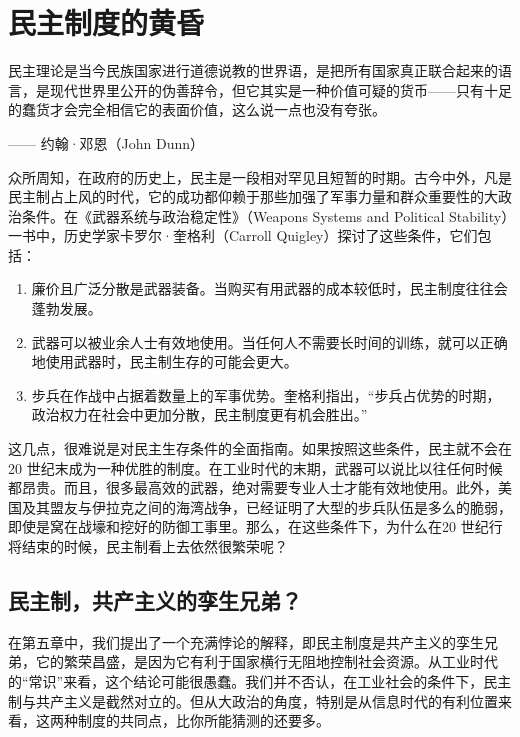 \chapter{民主制度的黄昏}

\begin{tcolorbox}
民主理论是当今民族国家进行道德说教的世界语，是把所有国家真正联合起来的语言，是现代世界里公开的伪善辞令，但它其实是一种价值可疑的货币——只有十足的蠢货才会完全相信它的表面价值，这么说一点也没有夸张。
\begin{flushright}
—— 约翰·邓恩（John Dunn）
\end{flushright}
\end{tcolorbox}


众所周知，在政府的历史上，民主是一段相对罕见且短暂的时期。古今中外，凡是民主制占上风的时代，它的成功都仰赖于那些加强了军事力量和群众重要性的大政治条件。在《武器系统与政治稳定性》（Weapons Systems and Political Stability）一书中，历史学家卡罗尔·奎格利（Carroll Quigley）探讨了这些条件，它们包括：

\begin{enumerate}
    \item 廉价且广泛分散是武器装备。当购买有用武器的成本较低时，民主制度往往会蓬勃发展。
    \item 武器可以被业余人士有效地使用。当任何人不需要长时间的训练，就可以正确地使用武器时，民主制生存的可能会更大。
    \item 步兵在作战中占据着数量上的军事优势。奎格利指出，“步兵占优势的时期，政治权力在社会中更加分散，民主制度更有机会胜出。” 
\end{enumerate}

这几点，很难说是对民主生存条件的全面指南。如果按照这些条件，民主就不会在 20 世纪末成为一种优胜的制度。在工业时代的末期，武器可以说比以往任何时候都昂贵。而且，很多最高效的武器，绝对需要专业人士才能有效地使用。此外，美国及其盟友与伊拉克之间的海湾战争，已经证明了大型的步兵队伍是多么的脆弱，即使是窝在战壕和挖好的防御工事里。那么，在这些条件下，为什么在20 世纪行将结束的时候，民主制看上去依然很繁荣呢？

\section{民主制，共产主义的孪生兄弟？}
在第五章中，我们提出了一个充满悖论的解释，即民主制度是共产主义的孪生兄弟，它的繁荣昌盛，是因为它有利于国家横行无阻地控制社会资源。从工业时代的“常识”来看，这个结论可能很愚蠢。我们并不否认，在工业社会的条件下，民主制与共产主义是截然对立的。但从大政治的角度，特别是从信息时代的有利位置来看，这两种制度的共同点，比你所能猜测的还要多。

